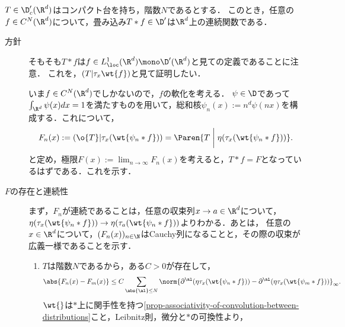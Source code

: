 \documentclass[uplatex,dvipdfmx]{jsreport}
\begin{document}
\begin{proposition}[畳み込みが連続になるための十分条件]\label{prop-convolution-to-be-continuous}
    $T\in\D'_c(\R^d)$はコンパクト台を持ち，階数$N$であるとする．
    このとき，任意の$f\in C^N(\R^d)$について，畳み込み$T*f\in\D'$は$\R^d$上の連続関数である．
\end{proposition}
\begin{Proof}\mbox{}
    \begin{description}
        \item[方針] 
        そもそも$T*f$は$f\in L^1_\loc(\R^d)\mono\D'(\R^d)$と見ての定義であることに注意．
        これを，$(T|\tau_x\wt{f})$と見て証明したい．
        
        いま$f\in C^N(\R^d)$でしかないので，$f$の軟化を考える．
        $\psi\in\D$であって$\int_{\R^d}\psi(x)dx=1$を満たすものを用いて，総和核$\psi_n(x):=n^d\psi(nx)$を構成する．これについて，
        \[F_n(x):=(\o{T}|\tau_x(\wt{\psi_n*f}))=\Paren{T\;\bigg|\;\eta(\tau_x(\wt{\psi_n*f}))}.\]
        と定め，極限$F(x):=\lim_{n\to\infty}F_n(x)$を考えると，$T*f=F$となっているはずである．これを示す．
        \item[$F$の存在と連続性] まず，$F_n$が連続であることは，任意の収束列$x\to a\in\R^d$について，$\eta(\tau_x(\wt{\psi_n*f}))\to\eta(\tau_a(\wt{\psi_n*f}))$よりわかる．あとは，
        任意の$x\in\R^d$について，$(F_n(x))_{n\in\N}$はCauchy列になることと，その際の収束が広義一様であることを示す．
        \begin{enumerate}[{Step}1]
            \item $T$は階数$N$であるから，ある$C>0$が存在して，
            \[\abs{F_n(x)-F_m(x)}\le C\sum_{\abs{\al}\le N}\norm{\partial^\al(\eta\tau_x(\wt{\psi_n*f}))-\partial^\al(\eta\tau_x(\wt{\psi_m*f}))}_\infty.\]
            $\wt{}$は$*$上に関手性を持つ\ref{prop-associativity-of-convolution-between-distributions}こと，Leibnitz則，微分と$*$の可換性より，

\end{enumerate}
\end{description}
\end{Proof}
\end{document}
